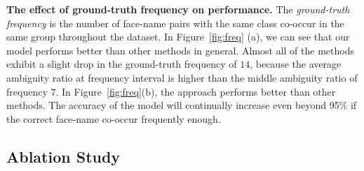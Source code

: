 \documentclass[letterpaper]{article} \usepackage{aaai20}  \usepackage{times}  \usepackage{helvet} \usepackage{courier}  \usepackage[hyphens]{url}  \usepackage{graphicx} \urlstyle{rm} \def\UrlFont{\rm}  \frenchspacing  \setlength{\pdfpagewidth}{8.5in}  \setlength{\pdfpageheight}{11in}  \frenchspacing
\begin{document}
\noindent\textbf{The effect of ground-truth frequency on performance.}
The \textit{ground-truth frequency} is the number of face-name pairs with the same class co-occur in the same group throughout the dataset.
In Figure~\ref{fig:freq} (a), we can see that our model performs better than other methods in general. Almost all of the methods exhibit a slight drop in the ground-truth frequency of $14$, because the average ambiguity ratio at frequency interval is higher than the middle ambiguity ratio of frequency $7$. In Figure~\ref{fig:freq}(b), the approach performs better than other methods. The accuracy of the model will continually increase even beyond 95\% if the correct face-name co-occur frequently enough. 









\begin{table}
  \caption{Ablation Study of Proposed Method DB-GAE}
  \label{sample-table2}
  \centering
  \end{table}
\subsection{Ablation Study}
\end{document}

